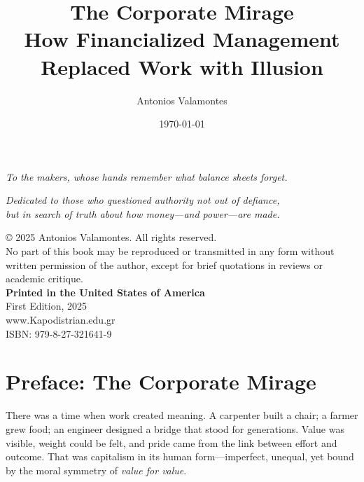 \documentclass[11pt,twoside]{book}
\title{\textbf{The Corporate Mirage}\\\large How Financialized Management Replaced Work with Illusion}
\author{Antonios Valamontes}
\date{\today}
\begin{document}
\frontmatter
\maketitle

\cleardoublepage
\thispagestyle{empty}
\vspace*{\fill}
\begin{center}
\textit{To the makers, whose hands remember what balance sheets forget.}
\end{center}
\vspace*{\fill}
\cleardoublepage

\tableofcontents

\newpage
\thispagestyle{empty}
\vspace*{6cm}
\begin{center}
\textit{
Dedicated to those who questioned authority not out of defiance,\\
but in search of truth about how money—and power—are made.}
\end{center}

\newpage
\thispagestyle{empty}
\vspace*{2cm}
\noindent
© 2025 Antonios Valamontes. All rights reserved.\\[0.5em]
No part of this book may be reproduced or transmitted in any form without written permission of the author, except for brief quotations in reviews or academic critique.\\[1em]
\noindent
\textbf{Printed in the United States of America}\\
First Edition, 2025 \\

www.Kapodistrian.edu.gr\\

{\small ISBN: 979-8-27-321641-9}\\

\cleardoublepage
%
\chapter*{Preface: The Corporate Mirage}

There was a time when work created meaning. A carpenter built a chair; a farmer grew food; an engineer designed a bridge that stood for generations. Value was visible, weight could be felt, and pride came from the link between effort and outcome. That was capitalism in its human form---imperfect, unequal, yet bound by the moral symmetry of \emph{value for value}.
\end{document}
